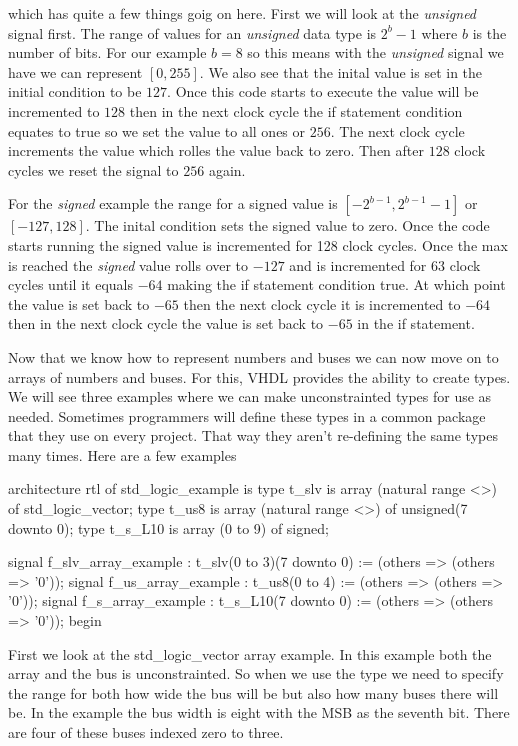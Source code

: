 which has quite a few things goig on here. First we will look at the \emph{unsigned} signal first. The range of values for an \emph{unsigned}	data type is $2^b-1$ where $b$ is the number of bits. For our example $b=8$ so this means with the \emph{unsigned} signal we have we can represent $[0,255]$. We also see that the inital value is set in the initial condition to be $127$. Once this code starts to execute the value will be incremented to $128$ then in the next clock cycle the if statement condition equates to true so we set the value to all ones or $256$. The next clock cycle increments the value which rolles the value back to zero. Then after $128$ clock cycles we reset the signal to $256$ again. 

For the \emph{signed} example the range for a signed value is $[-2^{b-1},2^{b-1}-1]$ or $[-127,128]$. The inital condition sets the signed value to zero. Once the code starts running the signed value is incremented for 128 clock cycles. Once the max is reached the \emph{signed} value rolls over to $-127$ and is incremented for $63$ clock cycles until it equals $-64$ making the if statement condition true. At which point the value is set back to $-65$ then the next clock cycle it is incremented to $-64$ then in the next clock cycle the value is set back to $-65$ in the if statement. 

Now that we know how to represent numbers and buses we can now move on to arrays of numbers and buses. For this, \ac{VHDL} provides the ability to create types. We will see three examples where we can make unconstrainted types for use as needed. Sometimes programmers will define these types in a common package that they use on every project. That way they aren't re-defining the same types many times. Here are a few examples

\begin{VHDLlisting}[tabsize=8]
architecture rtl of std_logic_example is
	type t_slv is array (natural range <>) of std_logic_vector;
	type t_us8 is array (natural range <>) of unsigned(7 downto 0);
	type t_s_L10 is array (0 to 9) of signed;

	signal f_slv_array_example : t_slv(0 to 3)(7 downto 0) := (others => (others => '0'));
	signal f_us_array_example  : t_us8(0 to 4)             := (others => (others => '0'));
	signal f_s_array_example   : t_s_L10(7 downto 0)       := (others => (others => '0'));
begin
\end{VHDLlisting}

First we look at the std\_logic\_vector array example. In this example both the array and the bus is unconstrainted. So when we use the type we need to specify the range for both how wide the bus will be but also how many buses there will be. In the example the bus width is eight with the \ac{MSB} as the seventh bit. There are four of these buses indexed zero to three. 

